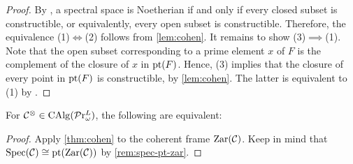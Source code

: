 \documentclass[10pt,a4paper,oneside]{article}
\begin{document}
\begin{proof}
By \cite[Theorem~8.1.11]{DickmannSchwartzTressl19}, a spectral space is Noetherian if and only if every closed subset is constructible, or equivalently, every open subset is constructible. Therefore, the equivalence (1)$\iff$(2) follows from \cref{lem:cohen}. It remains to show (3)$\implies$(1). Note that the open subset corresponding to a prime element $x$ of $F$ is the complement of the closure of $x$ in $\operatorname{pt}(F)$. Hence, (3) implies that the closure of every point in $\operatorname{pt}(F)$ is constructible, by \cref{lem:cohen}. The latter is equivalent to (1) by \cite[Theorem~8.1.11]{DickmannSchwartzTressl19}.
\end{proof}

\begin{cor}\label{cor:cohen}
For $\mathcal{C}^\otimes\in\operatorname{CAlg}(\mathcal{P}\mathrm{r}^L_{\omega})$, the following are equivalent:
\end{cor}

\begin{proof}
Apply \cref{thm:cohen} to the coherent frame $\operatorname{Zar}(\mathcal{C})$. Keep in mind that $\operatorname{Spec}(\mathcal C) \cong \operatorname{pt}(\operatorname{Zar}(\mathcal{C}))$ by \cref{rem:spec-pt-zar}.
\end{proof}


\end{document}
